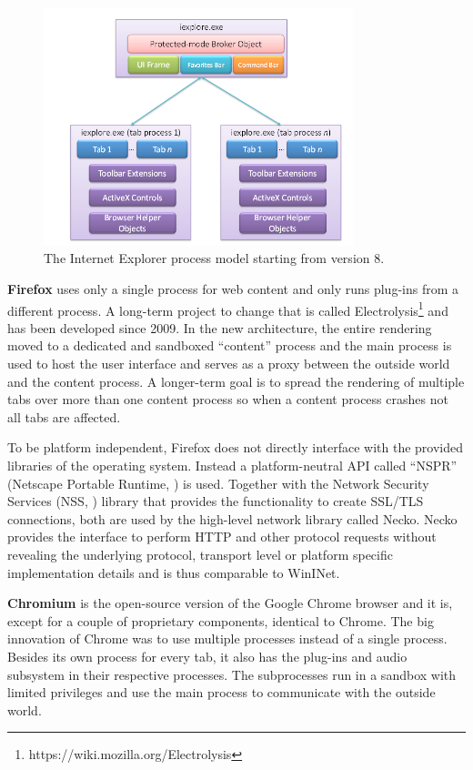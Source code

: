 \begin{figure}
    \centering
    \includegraphics[width=9cm]{Images/IE8_process_model.png}
    \caption{The Internet Explorer process model starting from version 8. \cite{IE8LCIEP}}
    \label{fig:ie8proc}
\end{figure}

\textbf{Firefox} uses only a single process for web content and only runs plug-ins from a different process. A long-term project to change that is called Electrolysis\footnote{https://wiki.mozilla.org/Electrolysis} and has been developed since 2009. In the new architecture, the entire rendering moved to a dedicated and sandboxed ``content'' process and the main process is used to host the user interface and serves as a proxy between the outside world and the content process. A longer-term goal is to spread the rendering of multiple tabs over more than one content process so when a content process crashes not all tabs are affected.

To be platform independent, Firefox does not directly interface with the provided libraries of the operating system. Instead a platform-neutral API called ``NSPR'' (Netscape Portable Runtime, \cite{nspr}) is used. Together with the Network Security Services (NSS, \cite{nss}) library that provides the functionality to create SSL/TLS connections, both are used by the high-level network library called Necko. Necko provides the interface to perform HTTP and other protocol requests without revealing the underlying protocol, transport level or platform specific implementation details and is thus comparable to WinINet.

\textbf{Chromium} is the open-source version of the Google Chrome browser and it is, except for a couple of proprietary components, identical to Chrome. The big innovation of Chrome \cite{ChromeMPA} was to use multiple processes instead of a single process. Besides its own process for every tab, it also has the plug-ins and audio subsystem in their respective processes. The subprocesses run in a sandbox with limited privileges and use the main process to communicate with the outside world.

